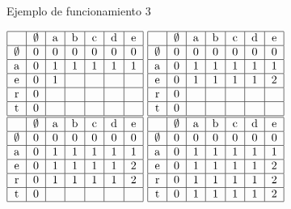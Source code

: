 \documentclass{beamer}
\begin{document}
				\begin{frame}{Ejemplo de funcionamiento 3}
 			
\begin{center}
	    		\(
	  			\begin{tabular}{ | c | c | c | c | c | c | c | }
	    				\hline
					   & $\emptyset$ & a & b  & c  & d & e \\ \hline
					$\emptyset$ & 0 & 0 & 0  & 0  & 0 & 0  \\ \hline
					a & 0 & 1 & 1 & 1 & 1 & 1 \\ \hline
					e & 0 & 1 &    &    &    &   \\ \hline
					r & 0 &   &    &    &    &   \\ \hline
					t & 0  &   &    &    &   &    \\
					\hline
				\end{tabular}
			    \)
	    		\hspace{.1in}
	    		\(
				\begin{tabular}{ | c | c | c | c | c | c | c | }
	    				\hline
					   & $\emptyset$ & a & b  & c  & d & e \\ \hline
					$\emptyset$ & 0 & 0 & 0  & 0  & 0 & 0  \\ \hline
					a & 0 & 1 & 1 & 1 & 1 & 1 \\ \hline
					e & 0 & 1 & 1 & 1 & 1 & 2 \\ \hline
					r & 0 &   &    &    &    &   \\ \hline
					t & 0  &   &    &    &   &    \\
					\hline
				\end{tabular}
			    \)
	    		\hspace{.1in}
	    		\(
				\begin{tabular}{ | c | c | c | c | c | c | c | }
	    				\hline
					   & $\emptyset$ & a & b  & c  & d & e \\ \hline
					$\emptyset$ & 0 & 0 & 0  & 0  & 0 & 0  \\ \hline
					a & 0 & 1 & 1 & 1 & 1 & 1 \\ \hline
					e & 0 & 1 & 1 & 1 & 1 & 2 \\ \hline
					r & 0 & 1 & 1 & 1 & 1 & 2 \\ \hline
					t & 0  &   &    &    &   &    \\
					\hline
				\end{tabular}
			    \)
	    		\hspace{.1in}
	    		\(
				\begin{tabular}{ | c | c | c | c | c | c | c | }
	    				\hline
					   & $\emptyset$ & a & b  & c  & d & e \\ \hline
					$\emptyset$ & 0 & 0 & 0  & 0  & 0 & 0  \\ \hline
					a & 0 & 1 & 1 & 1 & 1 & 1 \\ \hline
					e & 0 & 1 & 1 & 1 & 1 & 2 \\ \hline
					r & 0 & 1 & 1 & 1 & 1 & 2 \\ \hline
					t & 0  & 1 & 1 & 1 & 1 & 2 \\
					\hline
				\end{tabular}
		    	\)
			\end{center}	
					

\end{frame}
\end{document}
